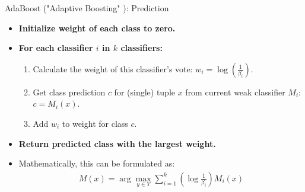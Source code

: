 \begin{frame}{AdaBoost ("Adaptive Boosting" ): Prediction}
	\begin{itemize}
		\item \textbf{Initialize weight of each class to zero.}
		\item \textbf{For each classifier $i$ in $k$ classifiers:}
		      \begin{enumerate}
			      \item Calculate the weight of this classifier's vote: $w_i = \log(\frac{1}{\beta_i})$.
			      \item Get class prediction $c$ for (single) tuple $x$ from current weak classifier $M_i$: $c = M_i(x)$.
			      \item Add $w_i$ to weight for class $c$.
		      \end{enumerate}
		\item \textbf{Return predicted class with the largest weight.}
		\item Mathematically, this can be formulated as:
		      \begin{align*}
			      \textstyle M(x)= \arg \max_{y\in Y} \sum_{i=1}^k (\log \frac{1}{\beta_i})M_i(x)
		      \end{align*}
	\end{itemize}
\end{frame}

